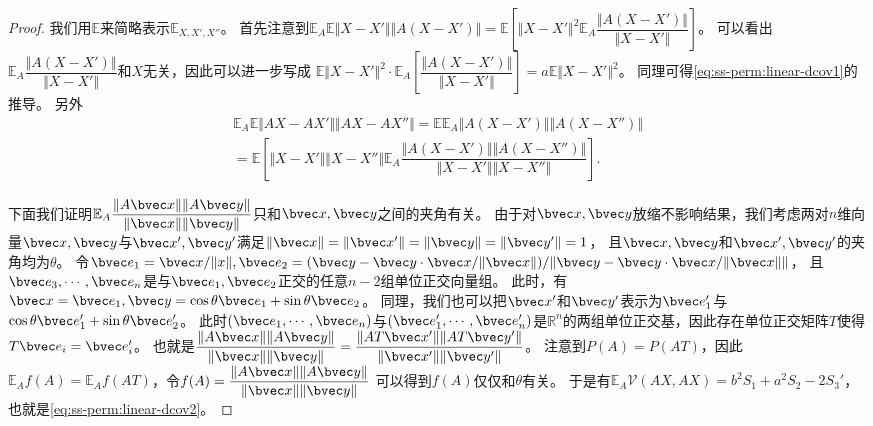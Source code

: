 \begin{proof}
我们用$\mathbb E$来简略表示$\mathbb E_{X,X',X''}$。
%
首先注意到$\mathbb E_A\mathbb E\Vert X - X' \Vert \Vert A(X - X') \Vert = \mathbb E \left[ \Vert X - X'\Vert^2 \mathbb E_A \dfrac{\Vert A(X - X') \Vert }{\Vert X - X'\Vert} \right]$。
%
可以看出$\mathbb E_A \dfrac{\Vert A(X - X') \Vert }{\Vert X - X'\Vert}$和$X$无关，因此可以进一步写成
$\mathbb E \Vert X - X'\Vert^2 \cdot \mathbb E_A \left[ \dfrac{\Vert A(X - X') \Vert }{\Vert X - X'\Vert} \right] = a\mathbb E \Vert X - X'\Vert^2$。
%
同理可得\autoref{eq:ss-perm:linear-dcov1}的推导。
另外
\begin{equation}
\begin{split}
    \mathbb E_A \mathbb E{\Vert AX - AX' \Vert \Vert AX - AX'' \Vert} = 
    \mathbb E \mathbb E_A \Vert A(X - X') \Vert \Vert A(X - X'') \Vert \\
    =
    \mathbb E \left[ \Vert X - X' \Vert \Vert X - X'' \Vert \mathbb E_A \dfrac{\Vert A(X - X') \Vert \Vert A(X - X'') \Vert}{\Vert X - X' \Vert \Vert X - X'' \Vert}  \right].
\end{split}
\end{equation}

下面我们证明$\mathbb E_A \dfrac{\Vert A\bvec x\Vert \Vert A \bvec y\Vert }{\Vert \bvec x \Vert \Vert \bvec y \Vert}$只和$\bvec x, \bvec y$之间的夹角有关。
%
由于对$\bvec x, \bvec y$放缩不影响结果，我们考虑两对$n$维向量$\bvec x, \bvec y$与$\bvec x', \bvec y'$满足$\Vert \bvec x \Vert = \Vert \bvec x' \Vert = \Vert \bvec y \Vert = \Vert \bvec y' \Vert = 1$，
且$\bvec x, \bvec y$和$\bvec x', \bvec y'$的夹角均为$\theta$。
%
令$\bvec e_1 = \bvec x/\Vert x \Vert, \bvec e_2 = (\bvec y - \bvec y \cdot \bvec x/\Vert \bvec x \Vert) / \Vert \bvec y - \bvec y \cdot \bvec x/\Vert \bvec x \Vert \Vert$，
且$\bvec e_3, \cdots, \bvec e_n$是与$\bvec e_1, \bvec e_2$正交的任意$n-2$组单位正交向量组。
%
此时，有$\bvec x = \bvec e_1, \bvec y = \cos \theta \bvec e_1 + \sin \theta \bvec e_2$。
%
同理，我们也可以把$\bvec x'$和$\bvec y'$表示为$\bvec e_1'$与$\cos \theta \bvec e'_1 + \sin \theta \bvec e'_2$。
%
此时$(\bvec e_1, \cdots, \bvec e_n)$与$(\bvec e'_1, \cdots, \bvec e'_n)$是$\mathbb R^n$的两组单位正交基，因此存在单位正交矩阵$T$使得$T\bvec e_i = \bvec e'_i$。
%
也就是$\dfrac{\Vert A\bvec x \Vert\Vert A\bvec y \Vert}{\Vert \bvec x\Vert \Vert \bvec y \Vert} = \dfrac{\Vert AT\bvec x' \Vert\Vert AT\bvec y' \Vert}{\Vert \bvec x'\Vert \Vert \bvec y' \Vert}$。
%
注意到$P(A)=P(AT)$，因此$\mathbb E_A f(A) = \mathbb E_A f(AT)$，令$f(A) = \dfrac{\Vert A\bvec x \Vert\Vert A\bvec y \Vert}{\Vert \bvec x\Vert \Vert \bvec y \Vert}$ 可以得到$f(A)$仅仅和$\theta$有关。
%
于是有$\mathbb E_A \mathcal{V}(AX, AX) = b^2 S_1 + a^2 S_2 - 2S_3'$，也就是\autoref{eq:ss-perm:linear-dcov2}。
\end{proof}

